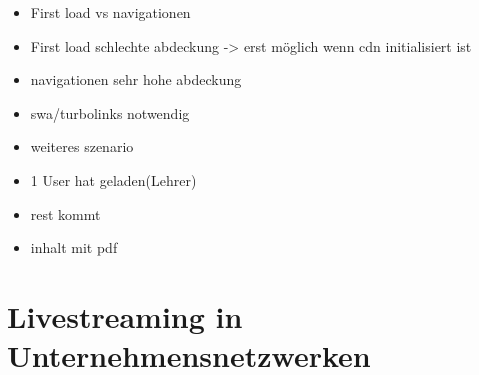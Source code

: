 \begin{itemize}
	\item First load vs navigationen
	\item First load schlechte abdeckung -> erst möglich wenn cdn initialisiert ist
	\item navigationen sehr hohe abdeckung
	\item swa/turbolinks notwendig
\end{itemize}


\begin{itemize}
	\item weiteres szenario 
	\item 1 User hat geladen(Lehrer)
	\item rest kommt
	\item inhalt mit pdf

\end{itemize}

\section{Livestreaming in Unternehmensnetzwerken}


